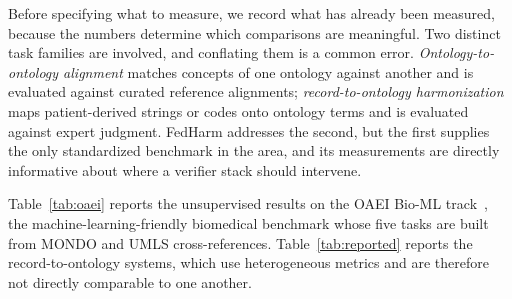 \documentclass[conference]{IEEEtran}
\begin{document}
Before specifying what to measure, we record what has already been measured, because the numbers determine which comparisons are meaningful. Two distinct task families are involved, and conflating them is a common error. \emph{Ontology-to-ontology alignment} matches concepts of one ontology against another and is evaluated against curated reference alignments; \emph{record-to-ontology harmonization} maps patient-derived strings or codes onto ontology terms and is evaluated against expert judgment. FedHarm addresses the second, but the first supplies the only standardized benchmark in the area, and its measurements are directly informative about where a verifier stack should intervene.

Table~\ref{tab:oaei} reports the unsupervised results on the OAEI Bio-ML track~\cite{b55}, the machine-learning-friendly biomedical benchmark whose five tasks are built from MONDO and UMLS cross-references. Table~\ref{tab:reported} reports the record-to-ontology systems, which use heterogeneous metrics and are therefore not directly comparable to one another.
\end{document}
